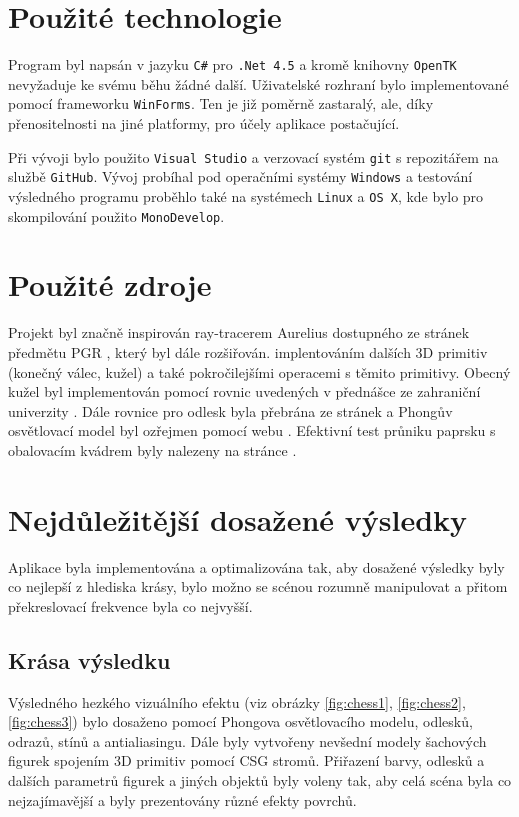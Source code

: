 \documentclass[12pt,a4paper,titlepage,final]{report}
\begin{document}
\chapter{Použité technologie}
Program byl napsán v jazyku \texttt{C\#} pro \texttt{.Net 4.5} a kromě knihovny \texttt{OpenTK} nevyžaduje ke svému běhu žádné další. Uživatelské rozhraní bylo implementované pomocí frameworku \texttt{WinForms}. Ten je již poměrně zastaralý, ale, díky přenositelnosti na jiné platformy, pro účely aplikace postačující.

Při vývoji bylo použito \texttt{Visual Studio} a verzovací systém \texttt{git} s repozitářem na službě \texttt{GitHub}. Vývoj probíhal pod operačními systémy \texttt{Windows} a testování výsledného programu proběhlo také na systémech \texttt{Linux} a \texttt{OS X}, kde bylo pro skompilování použito \texttt{MonoDevelop}.


\begingroup
\let\clearpage\relax
\chapter{Použité zdroje}
Projekt byl značně inspirován ray-tracerem Aurelius dostupného ze stránek předmětu PGR \cite{aurelius}, který byl dále rozšiřován. implentováním dalších 3D primitiv (konečný válec, kužel) a také pokročilejšími operacemi s těmito primitivy. Obecný kužel byl implementován pomocí rovnic uvedených v přednášce ze zahraniční univerzity \cite{cone}. Dále rovnice pro odlesk byla přebrána ze stránek \cite{reflect} a Phongův osvětlovací model byl ozřejmen pomocí webu \cite{phong}. Efektivní test průniku paprsku s obalovacím kvádrem byly nalezeny na stránce \cite{aabb}.

\endgroup

\chapter{Nejdůležitější dosažené výsledky}
Aplikace byla implementována a optimalizována tak, aby dosažené výsledky byly co nejlepší z hlediska krásy, bylo možno se scénou rozumně manipulovat a přitom překreslovací frekvence byla co nejvyšší.

\section{Krása výsledku}

Výsledného hezkého vizuálního efektu (viz obrázky \ref{fig:chess1}, \ref{fig:chess2}, \ref{fig:chess3}) bylo dosaženo pomocí Phongova osvětlovacího modelu, odlesků, odrazů, stínů a antialiasingu. Dále byly vytvořeny nevšední modely šachových figurek spojením 3D primitiv pomocí CSG stromů. Přiřazení barvy, odlesků a dalších parametrů figurek a jiných objektů byly voleny tak, aby celá scéna byla co nejzajímavější a byly prezentovány různé efekty povrchů.
\end{document}
